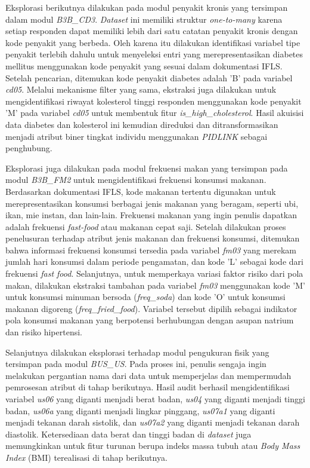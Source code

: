 Eksplorasi berikutnya dilakukan pada modul penyakit kronis yang tersimpan dalam modul \textit{B3B\_CD3}. \textit{Dataset} ini memiliki struktur \textit{one-to-many} karena setiap responden dapat memiliki lebih dari satu catatan penyakit kronis dengan kode penyakit yang berbeda. Oleh karena itu dilakukan identifikasi variabel tipe penyakit terlebih dahulu untuk menyeleksi entri yang merepresentasikan diabetes mellitus menggunakan kode penyakit yang sesuai dalam dokumentasi IFLS. Setelah pencarian, ditemukan kode penyakit diabetes adalah 'B' pada variabel \textit{cd05}. Melalui mekanisme filter yang sama, ekstraksi juga dilakukan untuk mengidentifikasi riwayat kolesterol tinggi responden menggunakan kode penyakit 'M' pada variabel \textit{cd05} untuk membentuk fitur \textit{is\_high\_cholesterol}. Hasil akuisisi data diabetes dan kolesterol ini kemudian direduksi dan ditransformasikan menjadi atribut biner tingkat individu menggunakan \textit{PIDLINK} sebagai penghubung.

Eksplorasi juga dilakukan pada modul frekuensi makan yang tersimpan pada modul \textit{B3B\_FM2} untuk mengidentifikasi frekuensi konsumsi makanan. Berdasarkan dokumentasi IFLS, kode makanan tertentu digunakan untuk merepresentasikan konsumsi berbagai jenis makanan yang beragam, seperti ubi, ikan, mie instan, dan lain-lain. Frekuensi makanan yang ingin penulis dapatkan adalah frekuensi \textit{fast-food} atau makanan cepat saji. Setelah dilakukan proses penelusuran terhadap atribut jenis makanan dan frekuensi konsumsi, ditemukan bahwa informasi frekuensi konsumsi tersedia pada variabel \textit{fm03} yang merekam jumlah hari konsumsi dalam periode pengamatan, dan kode 'L' sebagai kode dari frekuensi \textit{fast food}. Selanjutnya, untuk memperkaya variasi faktor risiko dari pola makan, dilakukan ekstraksi tambahan pada variabel \textit{fm03} menggunakan kode 'M' untuk konsumsi minuman bersoda (\textit{freq\_soda}) dan kode 'O' untuk konsumsi makanan digoreng (\textit{freq\_fried\_food}). Variabel tersebut dipilih sebagai indikator pola konsumsi makanan yang berpotensi berhubungan dengan asupan natrium dan risiko hipertensi.

Selanjutnya dilakukan eksplorasi terhadap modul pengukuran fisik yang tersimpan pada modul \textit{BUS\_US}. Pada proses ini, penulis sengaja ingin melakukan pergantian nama dari data untuk memperjelas dan mempermudah pemrosesan atribut di tahap berikutnya. Hasil audit berhasil mengidentifikasi variabel \textit{us06} yang diganti menjadi berat badan, \textit{us04} yang diganti menjadi tinggi badan, \textit{us06a} yang diganti menjadi lingkar pinggang, \textit{us07a1} yang diganti menjadi tekanan darah sistolik, dan \textit{us07a2} yang diganti menjadi tekanan darah diastolik. Ketersediaan data berat dan tinggi badan di \textit{dataset} juga memungkinkan untuk fitur turunan berupa indeks massa tubuh atau \textit{Body Mass Index} (BMI) terealisasi di tahap berikutnya.

